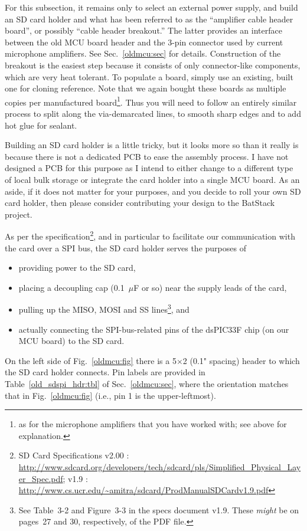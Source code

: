 \documentclass[letterpaper]{article}
\begin{document}
For this subsection, it remains only to select an external power
supply, and build an SD card holder and what has been referred to as
the ``amplifier cable header board'', or possibly ``cable header
breakout.'' The latter provides an interface between the old MCU board
header and the 3-pin connector used by current microphone
amplifiers. See Sec.~\ref{oldmcu:sec} for details. Construction of the
breakout is the easiest step because it consists of only
connector-like components, which are very heat tolerant. To populate a
board, simply use an existing, built one for cloning reference. Note
that we again bought these boards as multiple copies per manufactured
board\footnote{as for the microphone amplifiers that you have worked
  with; see above for explanation.}. Thus you will need to follow an
entirely similar process to split along the via-demarcated lines, to
smooth sharp edges and to add hot glue for sealant.

Building an SD card holder is a little tricky, but it looks more so
than it really is because there is not a dedicated PCB to ease the
assembly process. I have not designed a PCB for this purpose as I
intend to either change to a different type of local bulk storage or
integrate the card holder into a single MCU board. As an aside, if it
does not matter for your purposes, and you decide to roll your own SD
card holder, then please consider contributing your design to the
BatStack project.

As per the specification\footnote{SD Card Specifications v2.00 :
  \url{http://www.sdcard.org/developers/tech/sdcard/pls/Simplified_Physical_Layer_Spec.pdf};
  v1.9 :
  \url{http://www.cs.ucr.edu/~amitra/sdcard/ProdManualSDCardv1.9.pdf}},
and in particular to facilitate our communication with the card over a
SPI bus, the SD card holder serves the purposes of
\begin{itemize}
\item providing power to the SD card,

\item placing a decoupling cap (0.1~$\mu$F or so) near the supply
  leads of the card,

\item pulling up the MISO, MOSI and SS lines\footnote{See Table~3-2
  and Figure~3-3 in the specs document v1.9. These \textit{might} be
  on pages~27 and 30, respectively, of the PDF file.}, and

\item actually connecting the SPI-bus-related pins of the dsPIC33F chip
  (on our MCU board) to the SD card.
\end{itemize}
On the left side of Fig.~\ref{oldmcu:fig} there is a 5$\times$2 (0.1"
spacing) header to which the SD card holder connects. Pin labels are
provided in Table~\ref{old_sdspi_hdr:tbl} of Sec.~\ref{oldmcu:sec},
where the orientation matches that in Fig.~\ref{oldmcu:fig} (i.e., pin
1 is the upper-leftmost).
\end{document}
